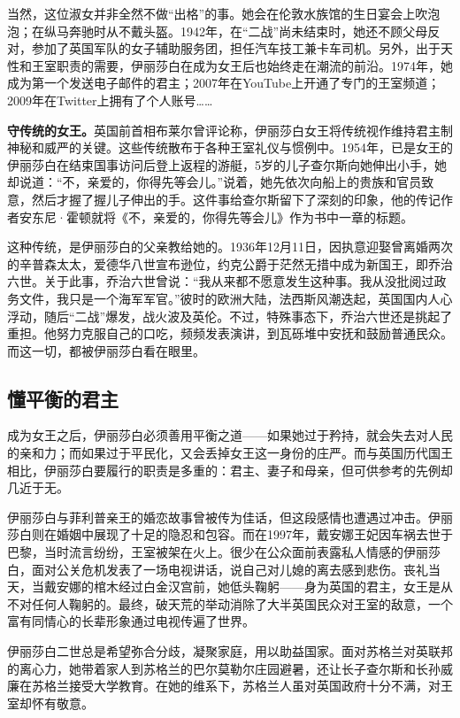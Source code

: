 当然，这位淑女并非全然不做“出格”的事。她会在伦敦水族馆的生日宴会上吹泡泡；在纵马奔驰时从不戴头盔。1942年，在“二战”尚未结束时，她还不顾父母反对，参加了英国军队的女子辅助服务团，担任汽车技工兼卡车司机。另外，出于天性和王室职责的需要，伊丽莎白在成为女王后也始终走在潮流的前沿。1974年，她成为第一个发送电子邮件的君主；2007年在YouTube上开通了专门的王室频道；2009年在Twitter上拥有了个人账号……

\textbf{守传统的女王。}英国前首相布莱尔曾评论称，伊丽莎白女王将传统视作维持君主制神秘和威严的关键。这些传统散布于各种王室礼仪与惯例中。1954年，已是女王的伊丽莎白在结束国事访问后登上返程的游艇，5岁的儿子查尔斯向她伸出小手，她却说道：“不，亲爱的，你得先等会儿。”说着，她先依次向船上的贵族和官员致意，然后才握了握儿子伸出的手。这件事给查尔斯留下了深刻的印象，他的传记作者安东尼·霍顿就将《不，亲爱的，你得先等会儿》作为书中一章的标题。

这种传统，是伊丽莎白的父亲教给她的。1936年12月11日，因执意迎娶曾离婚两次的辛普森太太，爱德华八世宣布逊位，约克公爵于茫然无措中成为新国王，即乔治六世。关于此事，乔治六世曾说：“我从来都不愿意发生这种事。我从没批阅过政务文件，我只是一个海军军官。”彼时的欧洲大陆，法西斯风潮迭起，英国国内人心浮动，随后“二战”爆发，战火波及英伦。不过，特殊事态下，乔治六世还是挑起了重担。他努力克服自己的口吃，频频发表演讲，到瓦砾堆中安抚和鼓励普通民众。而这一切，都被伊丽莎白看在眼里。

\subsection*{懂平衡的君主}

成为女王之后，伊丽莎白必须善用平衡之道——如果她过于矜持，就会失去对人民的亲和力；而如果过于平民化，又会丢掉女王这一身份的庄严。而与英国历代国王相比，伊丽莎白要履行的职责是多重的：君主、妻子和母亲，但可供参考的先例却几近于无。

伊丽莎白与菲利普亲王的婚恋故事曾被传为佳话，但这段感情也遭遇过冲击。伊丽莎白则在婚姻中展现了十足的隐忍和包容。而在1997年，戴安娜王妃因车祸去世于巴黎，当时流言纷纷，王室被架在火上。很少在公众面前表露私人情感的伊丽莎白，面对公关危机发表了一场电视讲话，说自己对儿媳的离去感到悲伤。丧礼当天，当戴安娜的棺木经过白金汉宫前，她低头鞠躬——身为英国的君主，女王是从不对任何人鞠躬的。最终，破天荒的举动消除了大半英国民众对王室的敌意，一个富有同情心的长辈形象通过电视传遍了世界。

伊丽莎白二世总是希望弥合分歧，凝聚家庭，用以助益国家。面对苏格兰对英联邦的离心力，她带着家人到苏格兰的巴尔莫勒尔庄园避暑，还让长子查尔斯和长孙威廉在苏格兰接受大学教育。在她的维系下，苏格兰人虽对英国政府十分不满，对王室却怀有敬意。

